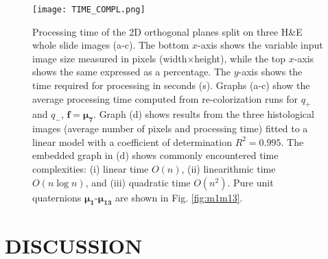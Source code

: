 \documentclass[superscriptaddress,longbibliography,aps,prl,twocolumn,10pt]{revtex4-2}
\begin{document}
\begin{figure}[t]
\centering
\texttt{[image: TIME\_COMPL.png]}
\vspace{-12pt}
\caption{\footnotesize{Processing time of the 2D orthogonal planes split on three H\&E whole slide images (a-c). The bottom $x$-axis shows the variable input image size measured in pixels (width$\times$height), while the top $x$-axis shows the same expressed as a percentage. The $y$-axis shows the time required for processing in seconds (s). Graphs (a-c) show the average processing time computed from re-colorization runs for $q_+$ and $q_-$, $\boldsymbol{f} = \boldsymbol{\mu_{7}}$. Graph (d) shows results from the three histological images (average number of pixels and processing time) fitted to a linear model with a coefficient of determination $R^2 = 0.995$. The embedded graph in (d) shows commonly encountered time complexities: (i) linear time $O(n)$, (ii) linearithmic time $O(n\log{}n)$, and (iii) quadratic time $O(n^2)$. Pure unit quaternions $\boldsymbol{\mu_{1}}$-$\boldsymbol{\mu_{13}}$ are shown in Fig. \ref{fig:m1m13}.}}
\label{fig:time_compl}
\end{figure}


\section*{\large\uppercase{Discussion}}
\end{document}

